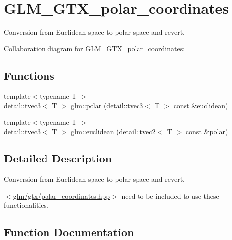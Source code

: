 \hypertarget{group__gtx__polar__coordinates}{}\section{G\+L\+M\+\_\+\+G\+T\+X\+\_\+polar\+\_\+coordinates}
\label{group__gtx__polar__coordinates}


Conversion from Euclidean space to polar space and revert.  


Collaboration diagram for G\+L\+M\+\_\+\+G\+T\+X\+\_\+polar\+\_\+coordinates\+:
\subsection*{Functions}
\begin{DoxyCompactItemize}
\item 
{\footnotesize template$<$typename T $>$ }\\detail\+::tvec3$<$ T $>$ \hyperlink{group__gtx__polar__coordinates_ga89025c86d0e2ee0a20f0cda440ea8ad5}{glm\+::polar} (detail\+::tvec3$<$ T $>$ const \&euclidean)
\item 
{\footnotesize template$<$typename T $>$ }\\detail\+::tvec3$<$ T $>$ \hyperlink{group__gtx__polar__coordinates_gad4fdb555828da7a586d79c0763eea759}{glm\+::euclidean} (detail\+::tvec2$<$ T $>$ const \&polar)
\end{DoxyCompactItemize}


\subsection{Detailed Description}
Conversion from Euclidean space to polar space and revert. 

$<$\hyperlink{polar__coordinates_8hpp}{glm/gtx/polar\+\_\+coordinates.\+hpp}$>$ need to be included to use these functionalities. 

\subsection{Function Documentation}
\hypertarget{group__gtx__polar__coordinates_gad4fdb555828da7a586d79c0763eea759}{}

